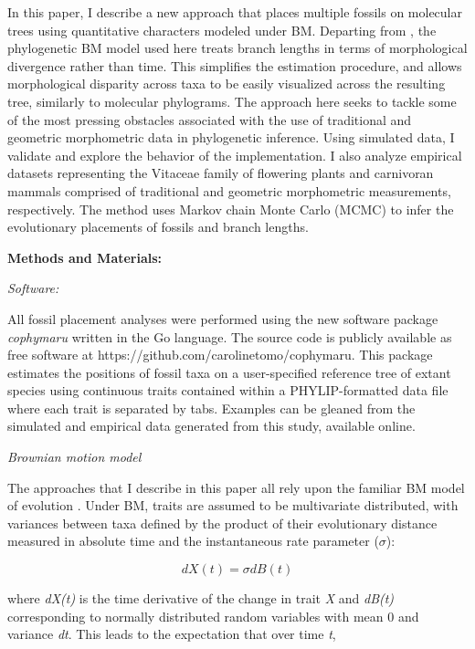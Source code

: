 \documentclass[12pt]{article}
\begin{document}
In this paper, I describe a new approach that places multiple fossils on
molecular trees using quantitative characters modeled under BM. Departing from \cite{revell2015placing}, the phylogenetic BM model used here treats branch lengths in terms of morphological divergence rather than time. This simplifies the estimation procedure, and allows morphological disparity across taxa to be easily visualized across the resulting tree, similarly to molecular phylograms.
 The approach here seeks to tackle some of the most pressing obstacles associated
with the use of traditional and geometric morphometric data in
phylogenetic inference. Using simulated data, I validate and explore the
behavior of the implementation. I also analyze empirical datasets
representing the Vitaceae family of flowering plants \citep{chen2009history}  and carnivoran
mammals \citep{jones2015impact} comprised of traditional and geometric
morphometric measurements, respectively. The method uses Markov chain
Monte Carlo (MCMC) to infer the evolutionary placements of fossils and
branch lengths.

\noindent\textbf{Methods and Materials:}

\noindent\emph{Software:}

All fossil placement analyses were performed using the new software package \emph{cophymaru} written in the Go
language. The source code is publicly available as free software at
https://github.com/carolinetomo/cophymaru. This package estimates the positions of fossil taxa on a user-specified reference tree of extant species
using continuous traits contained within a  PHYLIP-formatted data file where each trait is separated by tabs. Examples can be gleaned from
the simulated and empirical data generated from this study, available online.

\noindent\emph{Brownian motion model}

The approaches that I describe in this paper all rely upon the familiar
BM model of evolution \citep{butler2004phylogenetic,o2006testing} . Under BM, traits are assumed to be multivariate
distributed, with variances between taxa defined by the product of their
evolutionary distance measured in absolute time and the instantaneous
rate parameter ($\sigma$):

\begin{equation}
 dX(t) = \sigma dB(t)
\end{equation}

where \emph{dX(t)} is the time derivative of the change in trait
\emph{X} and \emph{dB(t)} corresponding to normally distributed random
variables with mean 0 and variance \emph{dt}. This leads to the
expectation that over time \emph{t},
\end{document}
